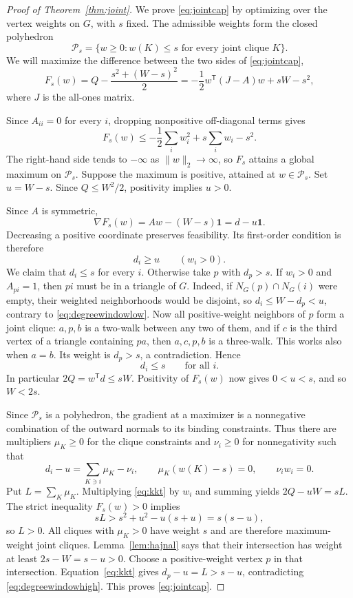 \documentclass[10pt]{article}
\theoremstyle{remark}
\newcommand{\calP}{\mathcal{P}}
\begin{document}
\begin{proof}[Proof of Theorem~\ref{thm:joint}]
We prove \eqref{eq:jointcap} by optimizing over the vertex weights on $G$, with $s$ fixed. The admissible weights form the closed polyhedron
\[
 \calP_s=\{w\ge0:w(K)\le s\text{ for every joint clique }K\}.
\]
We will maximize the difference between the two sides of \eqref{eq:jointcap},
\[
 F_s(w)=Q-\frac{s^2+(W-s)^2}{2}
       =-\frac12w^{\mathsf T}(J-A)w+sW-s^2,
\]
where $J$ is the all-ones matrix.

Since $A_{ii}=0$ for every $i$, dropping nonpositive off-diagonal terms gives
\[
 F_s(w)\le -\frac12\sum_i w_i^2+s\sum_i w_i-s^2.
\]
The right-hand side tends to $-\infty$ as $\|w\|_2\to\infty$, so $F_s$ attains a global maximum on $\calP_s$. Suppose the maximum is positive, attained at $w\in\calP_s$. Set $u=W-s$. Since $Q\le W^2/2$, positivity implies $u>0$.

Since $A$ is symmetric,
\[
 \nabla F_s(w)=Aw-(W-s)\mathbf1=d-u\mathbf1.
\]
Decreasing a positive coordinate preserves feasibility. Its first-order condition is therefore
\begin{equation}\label{eq:degreewindowlow}
 d_i\ge u\qquad(w_i>0).
\end{equation}
We claim that $d_i\le s$ for every $i$. Otherwise take $p$ with $d_p>s$. If $w_i>0$ and $A_{pi}=1$, then $pi$ must be in a triangle of $G$. Indeed, if $N_G(p)\cap N_G(i)$ were empty, their weighted neighborhoods would be disjoint, so $d_i\le W-d_p<u$, contrary to \eqref{eq:degreewindowlow}. Now all positive-weight neighbors of $p$ form a joint clique: $a,p,b$ is a two-walk between any two of them, and if $c$ is the third vertex of a triangle containing $pa$, then $a,c,p,b$ is a three-walk. This works also when $a=b$. Its weight is $d_p>s$, a contradiction. Hence
\begin{equation}\label{eq:degreewindowhigh}
 d_i\le s\qquad\text{for all }i.
\end{equation}
In particular $2Q=w^{\mathsf T}d\le sW$. Positivity of $F_s(w)$ now gives $0<u<s$, and so $W<2s$.

Since $\calP_s$ is a polyhedron, the gradient at a maximizer is a nonnegative combination of the outward normals to its binding constraints. Thus there are multipliers $\mu_K\ge0$ for the clique constraints and $\nu_i\ge0$ for nonnegativity such that
\begin{equation}\label{eq:kkt}
 d_i-u=\sum_{K\ni i}\mu_K-\nu_i,\qquad
 \mu_K(w(K)-s)=0,\qquad \nu_iw_i=0.
\end{equation}
Put $L=\sum_K\mu_K$. Multiplying \eqref{eq:kkt} by $w_i$ and summing yields $2Q-uW=sL$. The strict inequality $F_s(w)>0$ implies
\[
 sL>s^2+u^2-u(s+u)=s(s-u),
\]
so $L>0$. All cliques with $\mu_K>0$ have weight $s$ and are therefore maximum-weight joint cliques. Lemma~\ref{lem:hajnal} says that their intersection has weight at least $2s-W=s-u>0$. Choose a positive-weight vertex $p$ in that intersection. Equation~\eqref{eq:kkt} gives $d_p-u=L>s-u$, contradicting \eqref{eq:degreewindowhigh}. This proves \eqref{eq:jointcap}.


\end{proof}
\end{document}
